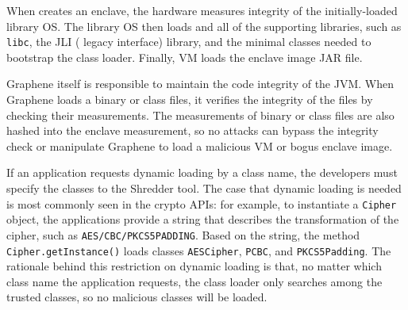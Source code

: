 When \sysname{} creates an enclave, the \sgx{} hardware measures integrity of the initially-loaded library OS.
The library OS then loads \jvm{} and all of the supporting libraries,
such as {\tt libc},
the JLI (\java{} legacy interface) library, and the minimal \java{} classes needed to bootstrap the class loader.
Finally, \java{} VM loads the enclave image JAR file.

Graphene itself is responsible to maintain the code integrity of the JVM.
When Graphene loads a binary or class files,
it verifies the integrity of the files by checking their measurements.
The measurements of binary or class files are also
hashed into the enclave measurement,
so no attacks can bypass the integrity check or manipulate Graphene to load  a malicious \java{} VM or bogus enclave image.

If an application requests dynamic loading by a class name,
the developers must specify the classes to the Shredder tool.
The case that dynamic loading is needed is most commonly seen in the crypto APIs:
for example, to instantiate a {\tt Cipher} object,
the applications provide a string that describes the transformation
of the cipher, such as {\tt AES/CBC/PKCS5PADDING}.
Based on the string, the method {\tt Cipher.getInstance()} loads classes
{\tt AESCipher}, {\tt PCBC}, and {\tt PKCS5Padding}.
The rationale behind this restriction on dynamic loading is that, no matter
which class name the application requests,
the class loader only searches among the trusted classes,
so no malicious classes will be loaded.


